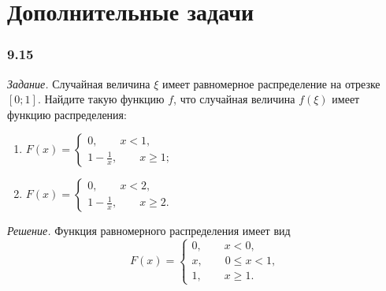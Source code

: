 \section*{Дополнительные задачи}

\subsubsection*{9.15}

\textit{Задание.} Случайная величина $ \xi $ имеет равномерное распределение на отрезке $ \left[ 0; 1 \right] $.
Найдите такую функцию $f$, что случайная величина $f \left( \xi \right) $ имеет функцию распределения:
\begin{enumerate}[label=\alph*)]
\item $F \left( x \right) =
\begin{cases}
0, \qquad x < 1, \\
1 - \frac{1}{x}, \qquad x \geq 1;
\end{cases}$
\item $F \left( x \right) =
\begin{cases}
0, \qquad x < 2, \\
1 - \frac{1}{x}, \qquad x \geq 2.
\end{cases}$
\end{enumerate}

\textit{Решение.} Функция равномерного распределения имеет вид
$$F \left( x \right) =
\begin{cases}
0, \qquad x < 0, \\
x, \qquad 0 \leq x < 1, \\
1, \qquad x \geq 1.
\end{cases}$$

